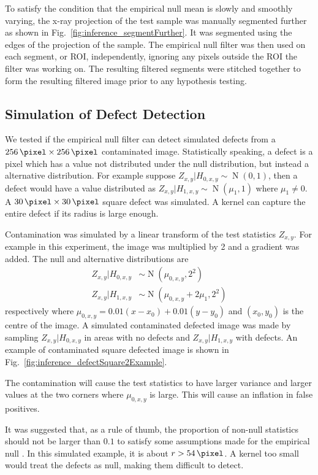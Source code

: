 \documentclass{article}
\DeclareMathOperator{\normal}{N}
\begin{document}
To satisfy the condition that the empirical null mean is slowly and smoothly varying, the x-ray projection of the test sample was manually segmented further as shown in Fig.~\ref{fig:inference_segmentFurther}. It was segmented using the edges of the projection of the sample. The empirical null filter was then used on each segment, or ROI, independently, ignoring any pixels outside the ROI the filter was working on. The resulting filtered segments were stitched together to form the resulting filtered image prior to any hypothesis testing.

\subsection{Simulation of Defect Detection}
\label{subsection:simulation}

We tested if the empirical null filter can detect simulated defects from a $\SI{256}{\pixel}\times \SI{256}{\pixel}$ contaminated image. Statistically speaking, a defect is a pixel which has a value not distributed under the null distribution, but instead a alternative distribution. For example suppose $Z_{x,y}|H_{0,x,y}\sim\normal(0,1)$, then a defect would have a value distributed as $Z_{x,y}|H_{1,x,y}\sim\normal(\mu_{1},1)$ where $\mu_1\neq0$. A $\SI{30}{\pixel}\times \SI{30}{\pixel}$ square defect was simulated. A kernel can capture the entire defect if its radius is large enough.

Contamination was simulated by a linear transform of the test statistics $Z_{x,y}$. For example in this experiment, the image was multiplied by 2 and a gradient was added. The null and alternative distributions are
\begin{align}
  Z_{x,y}|H_{0,x,y}&\sim\normal(\mu_{0,x,y},2^2)
  \\
  Z_{x,y}|H_{1,x,y}&\sim\normal(\mu_{0,x,y}+2\mu_1,2^2)
\end{align}
respectively where $\mu_{0,x,y}=0.01(x-x_0)+0.01(y-y_0)$ and $(x_0,y_0)$ is the centre of the image. A simulated contaminated defected image was made by sampling $Z_{x,y}|H_{0,x,y}$ in areas with no defects and $Z_{x,y}|H_{1,x,y}$ with defects. An example of contaminated square defected image is shown in Fig.~\ref{fig:inference_defectSquare2Example}.

The contamination will cause the test statistics to have larger variance and larger values at the two corners where $\mu_{0,x,y}$ is large. This will cause an inflation in false positives.

It was suggested that, as a rule of thumb, the proportion of non-null statistics should not be larger than $0.1$ to satisfy some assumptions made for the empirical null \citep{efron2004large, schwartzman2008empirical}. In this simulated example, it is about $r>\SI{54}{\pixel}$. A kernel too small would treat the defects as null, making them difficult to detect.
\end{document}
